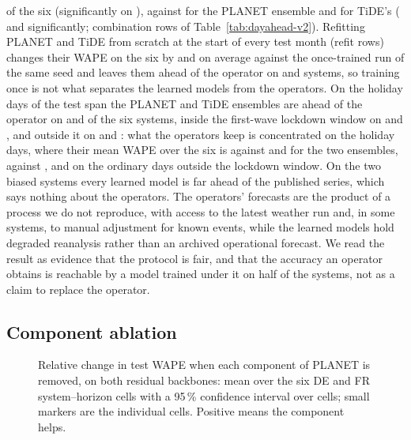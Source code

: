  of the six (significantly on
), against
 for the PLANET ensemble and
 for TiDE's (
and  significantly; combination rows of
Table~\ref{tab:dayahead-v2}). Refitting PLANET and TiDE from scratch at the start of every
test month (refit rows) changes their WAPE on the six by
 and
 on average against the once-trained run
of the same seed and leaves them ahead of the operator on
 and 
systems, so training once is not what separates the learned models from the operators. On the
holiday days of the test span the PLANET and TiDE ensembles are ahead of the operator on
 and 
of the six systems, inside the first-wave lockdown window on
 and ,
and outside it on  and
: what the operators keep is concentrated on
the holiday days, where their mean WAPE over the six is 
against  and
 for the two ensembles, against
,  and
 on the ordinary days outside the lockdown
window. On the two
biased systems every learned model is far ahead of the published series, which says nothing
about the operators. The operators' forecasts are the product of a process we do not
reproduce, with access to the latest weather run and, in some systems, to manual adjustment
for known events, while the learned models hold degraded reanalysis rather than an archived
operational forecast. We read the result as evidence that the protocol is fair, and that the
accuracy an operator obtains is reachable by a model trained under it on half of the systems,
not as a claim to replace the operator.

\subsection{Component ablation}
\label{sec:ablation}
\begin{figure}[!t]
\centering
{}
\caption{Relative change in test WAPE when each component of PLANET is removed, on both
residual backbones: mean over the six DE and FR system--horizon cells with a 95\,\%
confidence interval over cells; small markers are the individual cells. Positive means the
component helps.}
\label{fig:ablation}
\end{figure}

